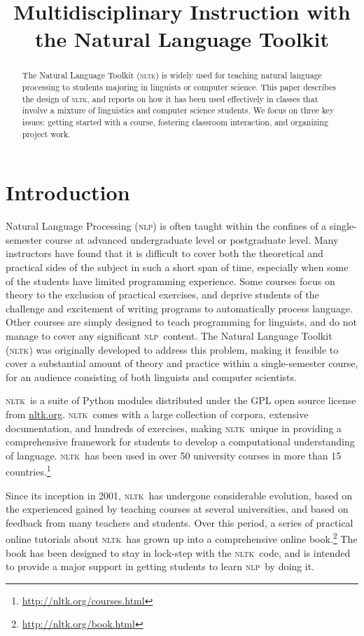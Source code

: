 \documentclass[11pt]{article}
\title{Multidisciplinary Instruction with the Natural Language Toolkit}
\author{}
\date{}
\newcommand{\NLP}{\textsc{nlp}}
\newcommand{\NLTK}{\textsc{nltk}}
\begin{document}
\maketitle
\begin{abstract}
  The Natural Language Toolkit (\NLTK) is widely used for teaching
  natural language processing to students majoring in linguists or
  computer science.  This paper describes the design of \NLTK, and
  reports on how it has been used effectively in classes that involve
  a mixture of linguistics and computer science students.  We focus
  on three key issues: getting started with a course, fostering
  classroom interaction, and organizing project work.
\end{abstract}

\section{Introduction}

Natural Language Processing (\NLP) is often taught within the confines
of a single-semester course at advanced undergraduate level or
postgraduate level. Many instructors have found that it is difficult
to cover both the theoretical and practical sides of the subject in
such a short span of time, especially when some of the students have
limited programming experience. Some courses focus on theory to the
exclusion of practical exercises, and deprive students of the
challenge and excitement of writing programs to automatically process
language. Other courses are simply designed to teach programming for
linguists, and do not manage to cover any significant \NLP\ content. The
Natural Language Toolkit (\NLTK) was originally developed to address
this problem, making it feasible to cover a substantial amount of
theory and practice within a single-semester course, for an audience
consisting of both linguists and computer scientists.

\NLTK\ is a suite of Python modules
distributed under the GPL open source license from \url{nltk.org}.
\NLTK\ comes with a large collection of corpora, extensive
documentation, and hundreds of exercises, making
\NLTK\ unique in providing a comprehensive framework for
students to develop a computational understanding of language.
\NLTK\ has been used in over 50 university courses in more than 15
countries.\footnote{\url{http://nltk.org/courses.html}}

Since its inception in 2001, \NLTK\ has undergone considerable
evolution, based on the experienced gained by teaching courses at
several universities, and based on feedback from many teachers and
students.  Over this period, a series of practical online tutorials
about \NLTK\ has grown up into a comprehensive online book.\footnote{\url{http://nltk.org/book.html}}
The book has been designed to stay in lock-step
with the \NLTK\ code, and is intended to provide a major support in
getting students to learn \NLP\ by doing it.
\end{document}

